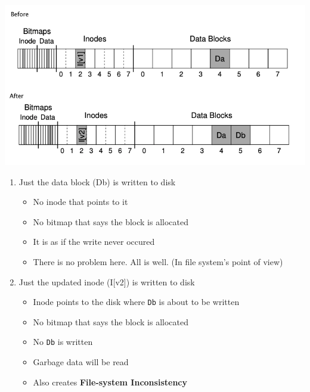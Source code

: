 \documentclass[12pt]{article}
\begin{document}
\begin{enumerate}[1.]
\begin{enumerate}[a)]
\begin{itemize}
            \begin{center}
            \includegraphics[width=\linewidth]{images/midterm_1_solution_19.png}
            \end{center}


            \begin{enumerate}[1)]
                \item Just the data block (Db) is written to disk

                \bigskip

                \begin{itemize}
                    \item No inode that points to it
                    \item No bitmap that says the block is allocated
                    \item It is as if the write never occured
                    \item There is no problem here. All is well. (In file system's point of view)
                \end{itemize}

                \bigskip

                \item Just the updated inode (I[v2]) is written to disk

                \bigskip

                \begin{itemize}
                    \item Inode points to the disk where \texttt{Db} is about to be written
                    \item No bitmap that says the block is allocated
                    \item No \texttt{Db} is written
                    \item Garbage data will be read
                    \item Also creates \textbf{File-system Inconsistency}


\end{itemize}
\end{enumerate}
\end{itemize}
\end{enumerate}
\end{enumerate}
\end{document}
